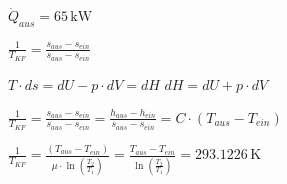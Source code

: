\( \dot{Q}_{aus} = 65 \, \text{kW} \)  

\( \frac{1}{T_{KF}} = \frac{s_{aus} - s_{ein}}{s_{aus} - s_{ein}} \)  

\( T \cdot ds = dU - p \cdot dV = dH \)  
\( dH = dU + p \cdot dV \)  

\( \frac{1}{T_{KF}} = \frac{s_{aus} - s_{ein}}{s_{aus} - s_{ein}} = \frac{h_{aus} - h_{ein}}{s_{aus} - s_{ein}} = C \cdot (T_{aus} - T_{ein}) \)  

\( \frac{1}{T_{KF}} = \frac{(T_{aus} - T_{ein})}{\mu \cdot \ln \left( \frac{T_2}{T_1} \right)} = \frac{T_{aus} - T_{ein}}{\ln \left( \frac{T_{2}}{T_{1}} \right)} = 293.1226 \, \text{K} \)